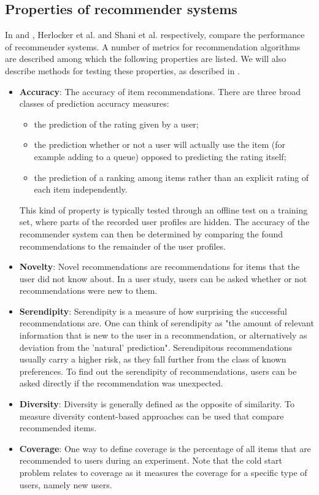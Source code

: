 \subsection{Properties of recommender systems}\label{chapter:literature_study:section:computer:subsection:properties}

In \cite{herlocker:2004:ECF:963770.963772} and \cite{shani:2011:9780387858197}, Herlocker et al. and Shani et al.  respectively, compare the performance of recommender systems. A number of metrics for recommendation algorithms are described among which the following properties are listed. We will also describe methods for testing these properties, as described in \cite{shani:2011:9780387858197}.

\begin{itemize}
	\item \textbf{Accuracy}: The accuracy of item recommendations. There are three broad classes of prediction accuracy measures:
	\begin{itemize}
		\item the prediction of the rating given by a user;
		\item the prediction whether or not a user will actually use the item (for example adding to a queue) opposed to predicting the rating itself;
		\item the prediction of a ranking among items rather than an explicit rating of each item independently.
	\end{itemize}
	This kind of property is typically tested through an offline test on a training set, where parts of the recorded user profiles are hidden. The accuracy of the recommender system can then be determined by comparing the found recommendations to the remainder of the user profiles.
	\item \textbf{Novelty}: Novel recommendations are recommendations for items that the user did not know about. In a user study, users can be asked whether or not recommendations were new to them.
	\item \textbf{Serendipity}: Serendipity is a measure of how surprising the successful recommendations are. One can think of serendipity as "the amount of relevant information that is new to the user in a recommendation, or alternatively as deviation from the 'natural' prediction"\cite{shani:2011:9780387858197}. Serendipitous recommendations usually carry a higher risk, as they fall further from the class of known preferences. To find out the serendipity of recommendations, users can be asked directly if the recommendation was unexpected.
	\item \textbf{Diversity}: Diversity is generally defined as the opposite of similarity. To measure diversity content-based approaches can be used that compare recommended items.
	\item \textbf{Coverage}: One way to define coverage is the percentage of all items that are recommended to users during an experiment. Note that the cold start problem relates to coverage as it measures the coverage for a specific type of users, namely new users.
\end{itemize}


